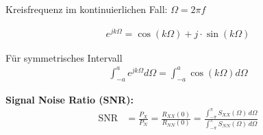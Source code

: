 Kreisfrequenz im kontinuierlichen Fall: $\Omega = 2 \pi f$

\begin{align}
e^{j k \Omega} = \cos(k \Omega) + j \cdot \sin(k \Omega)
\end{align}

Für symmetrisches Intervall
\begin{align}
\int_{-a}^{a} e^{j k \Omega} d\Omega = \int_{-a}^{a} \cos(k \Omega) d\Omega
\end{align}

\textbf{Signal Noise Ratio (SNR):}
\begin{align}
\text{SNR} &= \frac{P_X}{P_N} = \frac{R_{XX}(0)}{R_{NN}(0)} = \frac{\int_{-\pi}^{\pi} S_{XX}(\Omega) \, d\Omega}{\int_{-\pi}^{\pi} S_{NN}(\Omega) \, d\Omega}\\
\end{align}
